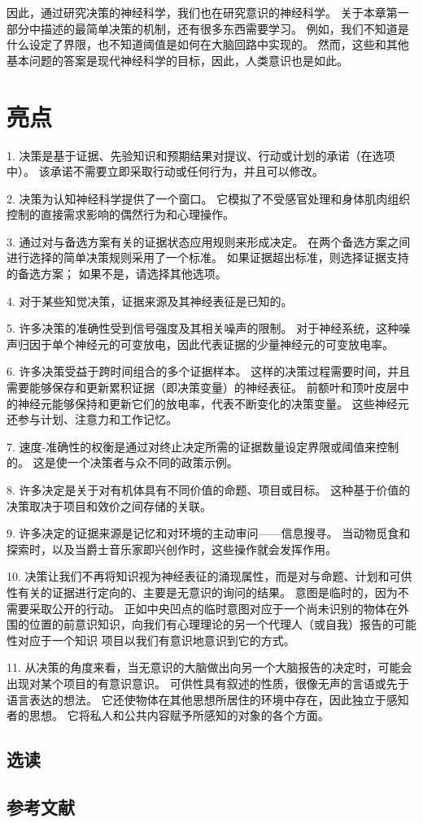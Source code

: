 因此，通过研究决策的神经科学，我们也在研究意识的神经科学。 关于本章第一部分中描述的最简单决策的机制，还有很多东西需要学习。 例如，我们不知道是什么设定了界限，也不知道阈值是如何在大脑回路中实现的。 然而，这些和其他基本问题的答案是现代神经科学的目标，因此，人类意识也是如此。



\section{亮点}

1. 决策是基于证据、先验知识和预期结果对提议、行动或计划的承诺（在选项中）。 该承诺不需要立即采取行动或任何行为，并且可以修改。 

2. 决策为认知神经科学提供了一个窗口。 它模拟了不受感官处理和身体肌肉组织控制的直接需求影响的偶然行为和心理操作。 

3. 通过对与备选方案有关的证据状态应用规则来形成决定。 在两个备选方案之间进行选择的简单决策规则采用了一个标准。 如果证据超出标准，则选择证据支持的备选方案； 如果不是，请选择其他选项。 

4. 对于某些知觉决策，证据来源及其神经表征是已知的。 

5. 许多决策的准确性受到信号强度及其相关噪声的限制。 对于神经系统，这种噪声归因于单个神经元的可变放电，因此代表证据的少量神经元的可变放电率。 

6. 许多决策受益于跨时间组合的多个证据样本。 这样的决策过程需要时间，并且需要能够保存和更新累积证据（即决策变量）的神经表征。 前额叶和顶叶皮层中的神经元能够保持和更新它们的放电率，代表不断变化的决策变量。 这些神经元还参与计划、注意力和工作记忆。 

7. 速度-准确性的权衡是通过对终止决定所需的证据数量设定界限或阈值来控制的。 这是使一个决策者与众不同的政策示例。 

8. 许多决定是关于对有机体具有不同价值的命题、项目或目标。 这种基于价值的决策取决于项目和效价之间存储的关联。 

9. 许多决定的证据来源是记忆和对环境的主动审问——信息搜寻。 当动物觅食和探索时，以及当爵士音乐家即兴创作时，这些操作就会发挥作用。 

10. 决策让我们不再将知识视为神经表征的涌现属性，而是对与命题、计划和可供性有关的证据进行定向的、主要是无意识的询问的结果。 意图是临时的，因为不需要采取公开的行动。 正如中央凹点的临时意图对应于一个尚未识别的物体在外围的位置的前意识知识，向我们有心理理论的另一个代理人（或自我）报告的可能性对应于一个知识 项目以我们有意识地意识到它的方式。 

11. 从决策的角度来看，当无意识的大脑做出向另一个大脑报告的决定时，可能会出现对某个项目的有意识意识。 可供性具有叙述的性质，很像无声的言语或先于语言表达的想法。 它还使物体在其他思想所居住的环境中存在，因此独立于感知者的思想。 它将私人和公共内容赋予所感知的对象的各个方面。
\subsection{选读}
\subsection{参考文献}